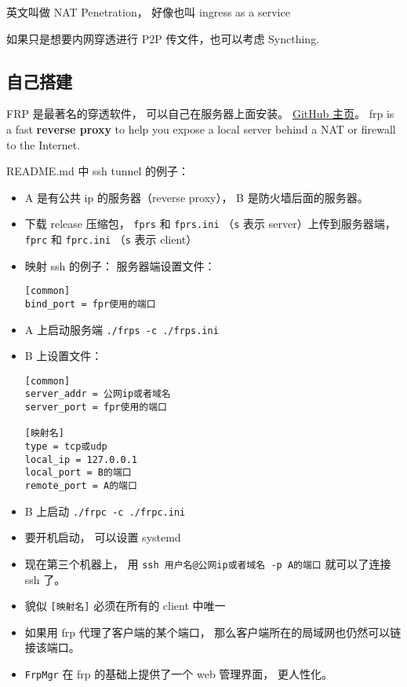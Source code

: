 
\begin{issues}
\issueDraft
\end{issues}

英文叫做 NAT Penetration， 好像也叫 ingress as a service

如果只是想要内网穿透进行 P2P 传文件，也可以考虑 Syncthing.

\subsection{自己搭建}
FRP 是最著名的穿透软件， 可以自己在服务器上面安装。 \href{https://github.com/fatedier/frp}{GitHub 主页}。
frp is a fast \textbf{reverse proxy} to help you expose a local server behind a NAT or firewall to the Internet.

README.md 中 ssh tunnel 的例子：
\begin{itemize}
\item A 是有公共 ip 的服务器（reverse proxy）， B 是防火墙后面的服务器。
\item 下载 release 压缩包， \verb|fprs| 和 \verb|fprs.ini| （\verb|s| 表示 server）上传到服务器端， \verb|fprc| 和 \verb|fprc.ini| （\verb|s| 表示 client）
\item 映射 ssh 的例子： 服务器端设置文件：
\begin{lstlisting}[language=none,caption=fprs.ini]
[common]
bind_port = fpr使用的端口
\end{lstlisting}
\item A 上启动服务端 \verb|./frps -c ./frps.ini|
\item B 上设置文件：
\begin{lstlisting}[language=none,caption=fprc.ini]
[common]
server_addr = 公网ip或者域名
server_port = fpr使用的端口

[映射名]
type = tcp或udp
local_ip = 127.0.0.1
local_port = B的端口
remote_port = A的端口
\end{lstlisting}
\item B 上启动 \verb|./frpc -c ./frpc.ini|
\item 要开机启动， 可以设置 systemd
\item 现在第三个机器上， 用 \verb|ssh 用户名@公网ip或者域名 -p A的端口| 就可以了连接 ssh 了。
\item 貌似 \verb|[映射名]| 必须在所有的 client 中唯一
\item 如果用 frp 代理了客户端的某个端口， 那么客户端所在的局域网也仍然可以链接该端口。
\item \verb|FrpMgr| 在 frp 的基础上提供了一个 web 管理界面， 更人性化。
\end{itemize}

